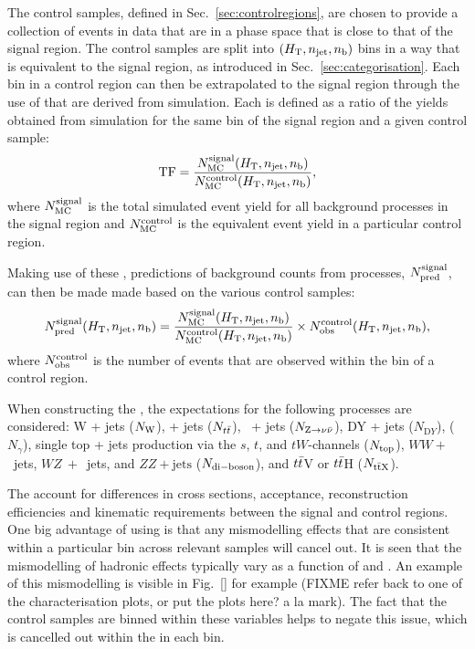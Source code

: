The control samples, defined in Sec.~\ref{sec:controlregions}, are
chosen to provide a collection of events in data that are in a phase
space that is close to that of the signal region. The control samples
are split into $(\mbox{$H_\text{T}$},n_{\mathrm{jet}},n_{\text{b}})$ bins in a way that is equivalent to the
signal region, as introduced in Sec.~\ref{sec:categorisation}. Each
bin in a control region can then be extrapolated to the signal region
through the use of \emph{\TFs} that are derived from
simulation.  Each \TF is defined as a ratio of the yields
obtained from \MC simulation for the same bin of the signal region and
a given control sample:
\begin{equation}
  \label{equ:tf-ratio}
  {\rm TF} = \frac{N_{\rm MC}^{\rm signal}(\mbox{$H_\text{T}$},n_{\mathrm{jet}},n_{\text{b}})}{N_{\rm
      MC}^{\rm control}(\mbox{$H_\text{T}$},n_{\mathrm{jet}},n_{\text{b}})}, 
\end{equation}
where $N_{\rm MC}^{\rm signal}$ is the total simulated event yield for
all background processes in the signal region and $N_{\rm MC}^{\rm
control}$ is the equivalent event yield in a particular control
region.

Making use of these \TFs, predictions of background counts from \SM
processes, $N_{\textrm{pred}}^{\rm signal}$, can then be made made based on the
various control samples:
\begin{equation}
  \label{equ:pred-method}
  N_{\textrm{pred}}^{\rm signal}(\mbox{$H_\text{T}$},n_{\mathrm{jet}},n_{\text{b}}) = \frac{N_{\rm MC}^{\rm
      signal}(\mbox{$H_\text{T}$},n_{\mathrm{jet}},n_{\text{b}})}{N_{\rm MC}^{\rm
      control}(\mbox{$H_\text{T}$},n_{\mathrm{jet}},n_{\text{b}})} \times N_{\textrm{obs}}^{\rm
    control}(\mbox{$H_\text{T}$},n_{\mathrm{jet}},n_{\text{b}}),
\end{equation}
where $N_{\textrm{obs}}^{\rm control}$ is the number of events that are observed
within the bin of a control region.

When constructing the \TFs, the \MC expectations for the following \SM
processes are considered: W + jets ($N_{\rm W}$), \ttbar + jets
($N_{t\bar{t}}$), \znunu\ + jets ($N_{{\text Z} \rightarrow \nu\bar{\nu}}$), DY + jets ($N_{\mathrm
DY}$), \gj ($N_\gamma$), single top + jets production via the $s$,
$t$, and $tW$-channels ($N_{\rm top}$), $WW+$~jets, $WZ~+$~jets, and
$ZZ + \textrm{jets}$ ($N_{\rm di-boson}$), and $t\bar{t}$V or $t\bar{t}$H
($N_{\rm {\ensuremath{t\bar{t}}}X}$). 

The \TFs account for differences in cross sections, acceptance,
reconstruction efficiencies and kinematic requirements between the
signal and control regions. One big advantage of using \TFs is that
any mismodelling effects that are consistent within a particular bin
across relevant \MC samples will cancel out. It is seen that the
mismodelling of hadronic effects typically vary as a function of \HT
and \nj. An example of this mismodelling is visible in Fig.~\ref{} for
example (FIXME refer back to one of the characterisation plots, or put
the plots here? a la mark). The fact that the control samples are
binned within these variables helps to negate this issue, which is
cancelled out within the \TF in each bin.

